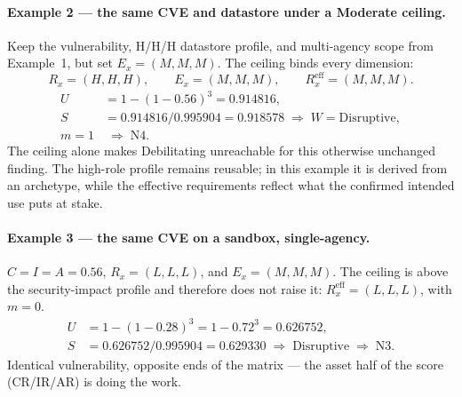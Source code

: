 \documentclass[11pt]{article}
\begin{document}
\paragraph{Example 2 --- the same CVE and datastore under a Moderate ceiling.}
Keep the vulnerability, H/H/H datastore profile, and multi-agency scope from
Example~1, but set $E_x=(M,M,M)$. The ceiling binds every dimension:
\[
R_x=(H,H,H),\qquad E_x=(M,M,M),\qquad
R_x^{\mathrm{eff}}=(M,M,M).
\]
\begin{align*}
U &= 1-(1-0.56)^3 = 0.914816, \\
S &= 0.914816/0.995904 = 0.918578
   \;\Rightarrow\; W=\text{Disruptive}, \\
m=1 &\;\Rightarrow\; \boxed{\text{N4}}.
\end{align*}
The ceiling alone makes Debilitating unreachable for this otherwise unchanged
finding. The high-role profile remains reusable; in this example it is derived
from an archetype, while the effective requirements reflect what the confirmed
intended use puts at stake.

\paragraph{Example 3 --- the same CVE on a sandbox, single-agency.}
$C\!=\!I\!=\!A\!=\!0.56$, $R_x=(L,L,L)$, and $E_x=(M,M,M)$.
The ceiling is above the security-impact profile and therefore does not raise it:
$R_x^{\mathrm{eff}}=(L,L,L)$, with $m=0$.
\begin{align*}
U &= 1-(1-0.28)^3 = 1-0.72^3 = 0.626752, \\
S &= 0.626752/0.995904 = 0.629330 \;\Rightarrow\; \text{Disruptive} \;\Rightarrow\; \boxed{\text{N3}}.
\end{align*}
Identical vulnerability, opposite ends of the matrix --- the asset half of the
score (CR/IR/AR) is doing the work.
\end{document}
